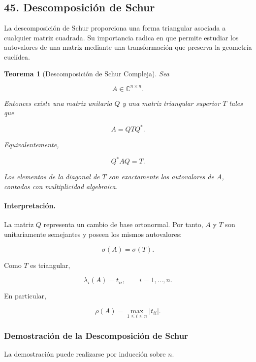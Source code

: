\documentclass[12pt]{article}
\newtheorem{teorema}{Teorema}
\begin{document}
\subsection*{45. Descomposición de Schur}

La descomposición de Schur proporciona una forma triangular asociada a
cualquier matriz cuadrada. Su importancia radica en que permite estudiar
los autovalores de una matriz mediante una transformación que preserva
la geometría euclídea.


\begin{teorema}[Descomposición de Schur Compleja]
Sea

\[
    A\in\mathbb{C}^{n\times n}.
\]

Entonces existe una matriz unitaria $Q$ y una matriz triangular superior
$T$ tales que

\[
    \boxed{
    A=QTQ^*.
    }
\]

Equivalentemente,

\[
    \boxed{
    Q^*AQ=T.
    }
\]

Los elementos de la diagonal de $T$ son exactamente los autovalores de
$A$, contados con multiplicidad algebraica.
\end{teorema}


\paragraph{Interpretación.}

La matriz $Q$ representa un cambio de base ortonormal. Por tanto,
$A$ y $T$ son unitariamente semejantes y poseen los mismos autovalores:

\[
    \sigma(A)=\sigma(T).
\]

Como $T$ es triangular,

\[
    \boxed{
    \lambda_i(A)=t_{ii},
    \qquad
    i=1,\ldots,n.
    }
\]

En particular,

\[
    \boxed{
    \rho(A)
    =
    \max_{1\leq i\leq n}|t_{ii}|.
    }
\]


\subsubsection*{Demostración de la Descomposición de Schur}

La demostración puede realizarse por inducción sobre $n$.
\end{document}
